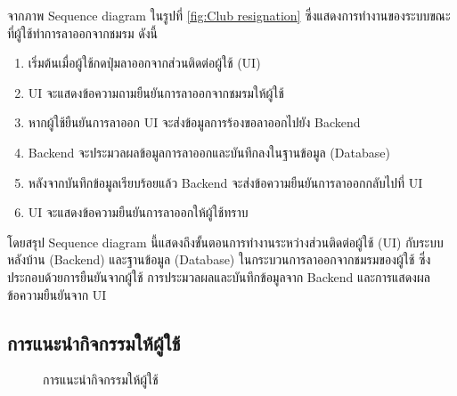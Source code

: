 \documentclass[14pt,oneside,openright,a4paper]{cpe-thai-project}
\begin{document}
  จากภาพ Sequence diagram ในรูปที่ \ref{fig:Club resignation} ซึ่งแสดงการทำงานของระบบขณะที่ผู้ใช้ทำการลาออกจากชมรม ดังนี้
  \begin{enumerate}
    \item เริ่มต้นเมื่อผู้ใช้กดปุ่มลาออกจากส่วนติดต่อผู้ใช้ (UI)
    \item UI จะแสดงข้อความถามยืนยันการลาออกจากชมรมให้ผู้ใช้
    \item หากผู้ใช้ยืนยันการลาออก UI จะส่งข้อมูลการร้องขอลาออกไปยัง Backend
    \item Backend จะประมวลผลข้อมูลการลาออกและบันทึกลงในฐานข้อมูล (Database)
    \item หลังจากบันทึกข้อมูลเรียบร้อยแล้ว Backend จะส่งข้อความยืนยันการลาออกกลับไปที่ UI
    \item UI จะแสดงข้อความยืนยันการลาออกให้ผู้ใช้ทราบ
  \end{enumerate}
  โดยสรุป Sequence diagram นี้แสดงถึงขั้นตอนการทำงานระหว่างส่วนติดต่อผู้ใช้ (UI) กับระบบหลังบ้าน (Backend) และฐานข้อมูล (Database) ในกระบวนการลาออกจากชมรมของผู้ใช้ ซึ่งประกอบด้วยการยืนยันจากผู้ใช้ การประมวลผลและบันทึกข้อมูลจาก Backend และการแสดงผลข้อความยืนยันจาก UI

  \newpage

\subsection{การแนะนำกิจกรรมให้ผู้ใช้}

  \begin{figure}[!h]\centering
    \setlength{\fboxrule}{0.5mm} %
    \setlength{\fboxsep}{0.5cm}
    \caption{การแนะนำกิจกรรมให้ผู้ใช้}\label{fig:Feed recommendation}
  \end{figure}
\end{document}
